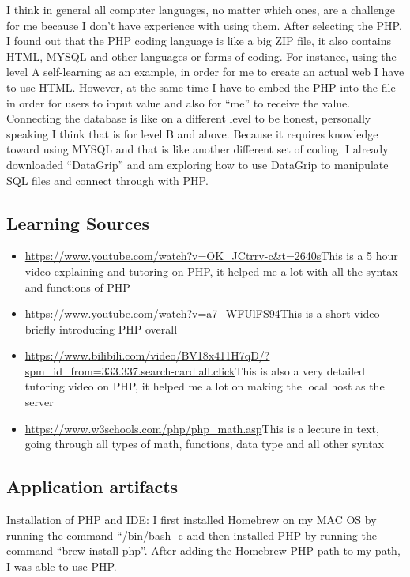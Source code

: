 \documentclass[a4paper, 11pt]{report}
\begin{document}
I think in general all computer languages, no matter which ones, are a challenge for me because I don’t have experience with using them. After selecting the PHP, I found out that the PHP coding language is like a big ZIP file, it also contains HTML, MYSQL and other languages or forms of coding. For instance, using the level A self-learning as an example, in order for me to create an actual web I have to use HTML. However, at the same time I have to embed the PHP into the file in order for users to input value and also for “me” to receive the value. Connecting the database is like on a different level to be honest, personally speaking I think that is for level B and above. Because it requires knowledge toward using MYSQL and that is like another different set of coding. I already downloaded “DataGrip” and am exploring how to use DataGrip to manipulate SQL files and connect through with PHP.

\subsection{Learning Sources}
\begin{itemize}
  \item \url{https://www.youtube.com/watch?v=OK_JCtrrv-c&t=2640s}{This is a 5 hour video explaining and tutoring on PHP, it helped me a lot with all the syntax and functions of PHP}\cite{PHP}
  \item \url{https://www.youtube.com/watch?v=a7_WFUlFS94}{This is a short video briefly introducing PHP overall}\cite{PHP100}
  \item \url{https://www.bilibili.com/video/BV18x411H7qD/?spm_id_from=333.337.search-card.all.click}{This is also a very detailed tutoring video on PHP, it helped me a lot on making the local host as the server}\cite{HM}
  \item \url{https://www.w3schools.com/php/php_math.asp}{This is a lecture in text, going through all types of math, functions, data type and all other syntax}\cite{W3}
\end{itemize}




\newpage
\subsection{Application artifacts}

Installation of PHP and IDE:
I first installed Homebrew on my MAC OS by running the command “/bin/bash -c and then installed PHP by running the command “brew install php”. After adding the Homebrew PHP path to my path, I was able to use PHP.
\end{document}
